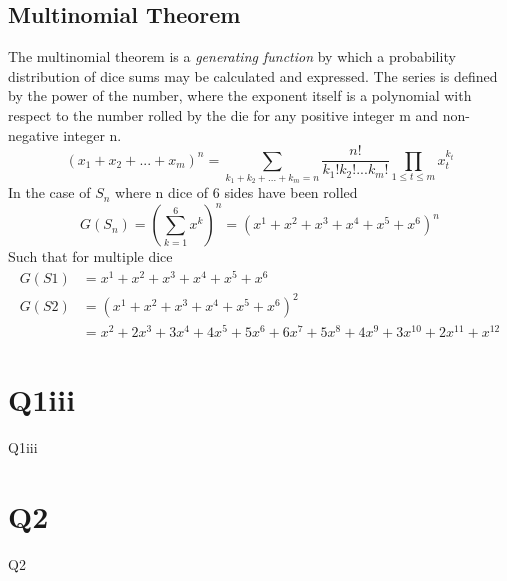 \documentclass[12pt]{article}
\begin{document}
\subsection{Multinomial Theorem}
The multinomial theorem is a \emph{generating function} by which a probability distribution of dice sums may be calculated and expressed. The series is defined by the power of the number, where the exponent itself is a polynomial with respect to the number rolled by the die for any positive integer m and non-negative integer n.
$$(x_1+x_2+...+x_m)^n=\sum_{k_1+k_2+...+k_m=n}{}\frac{n!}{k_1!k_2!...k_m!}\prod_{1\leq t\leq m}^{}x_{t}^{k_t}$$
In the case of $S_n$ where n dice of 6 sides have been rolled
$$G(S_n)=\left(\sum_{k=1}^{6}x^k\right)^n=(x^1+x^2+x^3+x^4+x^5+x^6)^n$$
Such that for multiple dice
\begin{align*}
G(S1)&=x^1+x^2+x^3+x^4+x^5+x^6\\
G(S2)&=(x^1+x^2+x^3+x^4+x^5+x^6)^2\\
&=x^2+2x^3+3x^4+4x^5+5x^6+6x^7+5x^8+4x^9+3x^{10}+2x^{11}+x^{12}
\end{align*}

\clearpage

\section{Q1iii}
Q1iii
\clearpage

\section{Q2}
Q2
\clearpage
\end{document}
